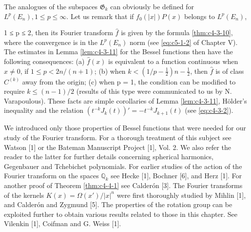  The analogues of the subspaces $\mathfrak{G}_k$ can obviously be defined for $L^p(E_n), 1 \leq p \leq \infty$. Let us remark that if $f_0(|x|)P(x)$ belongs to $L^p(E_n)$,

1 ≤ p ≤ 2, then its Fourier transform $\hat{f}$ is given by the formula \eqref{thm:c4-3-10}, where the convergence is in the $L^p(E_n)$ norm (see \eqref{eq:c5-1-2} of Chapter V). The estimates in Lemma \ref{lem:c4-3-11} for the Bessel functions then have the following consequences: (a) $\hat{f}(x)$ is equivalent to a function continuous when $x \neq 0$, if $1 \leq p < 2n/(n+1)$; (b) when $k < (1/p - \frac{1}{2})n - \frac{1}{2}$, then $\hat{f}$ is of class $C^{(k)}$ away from the origin; (c) when p = 1, the condition can be modified to require $k \leq (n-1)/2$ (results of this type were communicated to us by N. Varapoulous). These facts are simple corollaries of Lemma \ref{lem:c4-3-11}, Hölder's inequality and the relation $(t^{-k}J_k(t))' = -t^{-k}J_{k+1}(t)$ (see \eqref{eq:c4-3-2}).

\bibnoteshead

We introduced only those properties of Bessel functions that were needed for our study of the Fourier transform. For a thorough treatment of this subject see Watson [1] or the Bateman Manuscript Project [1], Vol. 2. We also refer the reader to the latter for further details concerning spherical harmonics, Gegenbauer and Tchebichet polynomials. For earlier studies of the action of the Fourier transform on the spaces $\mathbb{Q}_k$ see Hecke [1], Bochner [6], and Herz [1]. For another proof of Theorem \ref{thm:c4-4-1} see Calderón [3]. The Fourier transforms of the kernels $K(x) = \Omega(x')/|x|^n$ were first thoroughly studied by Mihlin [1], and Calderón and Zygmund [5]. The properties of the rotation group can be exploited further to obtain various results related to those in this chapter. See Vilenkin [1], Coifman and G. Weiss [1].

